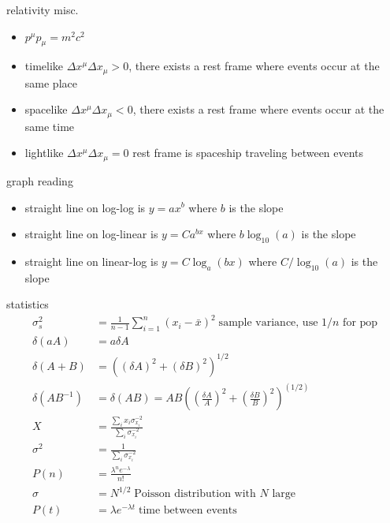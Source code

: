 \documentclass[avery5388, frame]{flashcards}
\begin{document}
\begin{flashcard}{relativity misc.}
  {
    \begin{itemize}
    \item $p^{\mu}p_{\mu} = m^{2}c^{2}$
    \item timelike $\Delta x^{\mu} \Delta x_{\mu} > 0$, there exists a rest frame where events occur at the same place
    \item spacelike $\Delta x^{\mu} \Delta x_{\mu} < 0$, there exists a rest frame where events occur at the same time
    \item lightlike $\Delta x^{\mu} \Delta x_{\mu} = 0$ rest frame is spaceship traveling between events
    \end{itemize}
  }
\end{flashcard}


\begin{flashcard}{graph reading}
  {
    \begin{itemize}
    \item straight line on log-log is $y = ax^{b}$ where $b$ is the slope
    \item straight line on log-linear is $y = C a^{bx}$ where $b \log_{10}(a)$ is the slope
    \item straight line on linear-log is $y = C\log_{a}(bx)$ where $C / \log_{10}(a)$ is the slope
    \end{itemize}
  }
\end{flashcard}

\begin{flashcard}{statistics}
  {
    \begin{align*}
      \sigma_{s}^{2} &= \frac{1}{n - 1} \sum_{i = 1}^{n} (x_{i} - \bar{x})^{2} \; \textrm{sample variance, use $1/n$ for pop}\\
      \delta(a A) &= a \delta A\\
      \delta(A + B) &= ((\delta A)^{2} + (\delta B)^{2})^{1/2}\\
      \delta(AB^{-1}) & = \delta(AB) = AB ((\frac{\delta A}{A})^{2} + (\frac{\delta B}{B})^{2})^(1/2)\\
      X &= \frac{\sum_{i} x_{i} \sigma_{x_{i}}^{-2}}{\sum_{i} \sigma_{x_{i}}^{-2}}\\
      \sigma^{2} &= \frac{1}{\sum_{i} \sigma_{x_{i}}^{-2}}\\
      P(n) &= \frac{\lambda^{n}e^{- \lambda}}{n!}\\
      \sigma &= N^{1/2} \; \textrm{Poisson distribution with $N$ large}\\
      P(t) &= \lambda e^{- \lambda t} \; \textrm{time between events}
    \end{align*}
  }
\end{flashcard}
\end{document}
